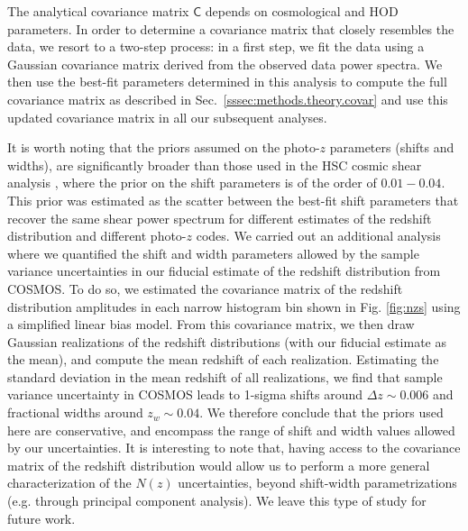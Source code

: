 \documentclass[a4paper,11pt]{article}
\begin{document}
The analytical covariance matrix $\mathsf{C}$ depends on cosmological and HOD parameters. In order to determine a covariance matrix that closely resembles the data, we resort to a two-step process: in a first step, we fit the data using a Gaussian covariance matrix derived from the observed data power spectra. We then use the best-fit parameters determined in this analysis to compute the full covariance matrix as described in Sec.~\ref{sssec:methods.theory.covar} and use this updated covariance matrix in all our subsequent analyses.
    
It is worth noting that the priors assumed on the photo-$z$ parameters (shifts and widths), are significantly broader than those used in the HSC cosmic shear analysis \cite{2019PASJ...71...43H}, where the prior on the shift parameters is of the order of $0.01-0.04$. This prior was estimated as the scatter between the best-fit shift parameters that recover the same shear power spectrum for different estimates of the redshift distribution and different photo-$z$ codes. We carried out an additional analysis where we quantified the shift and width parameters allowed by the sample variance uncertainties in our fiducial estimate of the redshift distribution from COSMOS. To do so, we estimated the covariance matrix of the redshift distribution amplitudes in each narrow histogram bin shown in Fig. \ref{fig:nzs} using a simplified linear bias model. From this covariance matrix, we then draw Gaussian realizations of the redshift distributions (with our fiducial estimate as the mean), and compute the mean redshift of each realization. Estimating the standard deviation in the mean redshift of all realizations, we find that sample variance uncertainty in COSMOS leads to 1-sigma  shifts around $\Delta z\sim0.006$ and fractional widths around $z_w\sim 0.04$.  We therefore conclude that the priors used here are conservative, and encompass the range of shift and width values allowed by our uncertainties. It is interesting to note that, having access to the covariance matrix of the redshift distribution would allow us to perform a more general characterization of the $N(z)$ uncertainties, beyond shift-width parametrizations (e.g. through principal component analysis). We leave this type of study for future work.
\end{document}
